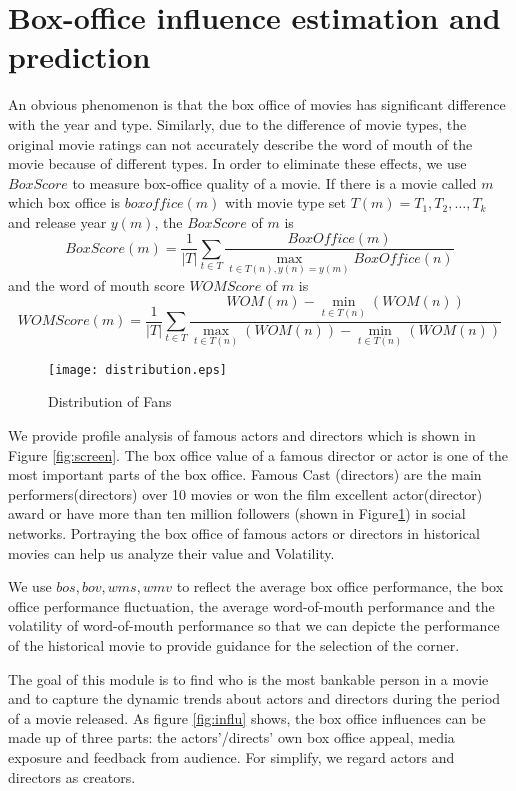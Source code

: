 \section{Box-office influence estimation and prediction}
\label{sec:impact}
An obvious phenomenon is that the box office of movies has significant difference with the year and type.  Similarly, due to the difference of movie types, the original movie ratings can not accurately describe the word of mouth of the movie because of different types. In order to eliminate these effects, we use $BoxScore$ to measure box-office quality of a movie. If there is a movie called $m$ which box office is $boxoffice(m)$ with movie type set $T(m)={T_1,T_2,\ldots,T_k}$ and release year $y(m)$, the $BoxScore$ of $m$ is
\begin{equation}
BoxScore(m)=\frac{1}{|T|}\sum_{t\in T}\frac{BoxOffice(m)}{\max_{t\in T(n),y(n)=y(m)}BoxOffice(n)}
\end{equation}
and the word of mouth score $WOMScore$ of $m$ is
\begin{equation}
WOMScore(m)=\frac{1}{|T|}\sum_{t\in T}\frac{WOM(m)-\min_{t\in T(n)}(WOM(n))}{\max_{t\in T(n)}(WOM(n))-\min_{t\in T(n)}(WOM(n))}
\end{equation}
\begin{figure}[!htbp]
\centering
\texttt{[image: distribution.eps]}
\caption{Distribution of Fans}
\label{fig:dist}
\end{figure}
\par We provide profile analysis of famous actors and directors which is shown in Figure \ref{fig:screen}. The box office value of a famous director or actor is one of the most important parts of the box office. Famous Cast (directors) are the main performers(directors) over 10 movies or won the film excellent actor(director) award or have more than ten million followers (shown in Figure\ref{fig:dist}) in social networks. Portraying the box office of famous actors or directors in historical movies can help us analyze their value and Volatility.
\par We use $bos,bov,wms,wmv$ to reflect the average box office performance, the box office performance fluctuation, the average word-of-mouth performance and the volatility of word-of-mouth performance so that we can depicte the performance of the historical movie to provide guidance for the selection of the corner.
\par The goal of this module is to find who is the most bankable person in a movie and to capture the dynamic trends about actors and directors during the period of a movie released. As figure \ref{fig:influ} shows, the box office influences can be made up of three parts: the actors'/directs' own box office appeal, media exposure and feedback from audience. For simplify, we regard actors and directors as creators.
